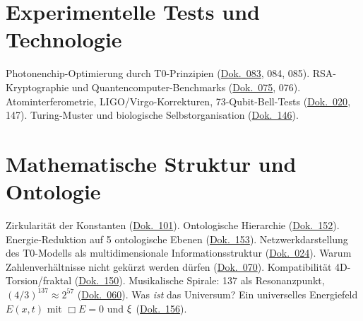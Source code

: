 \section{Experimentelle Tests und Technologie}
Photonenchip-Optimierung durch T0-Prinzipien (\href{https://github.com/jpascher/T0-Time-Mass-Duality/blob/main/2/pdf/083_T0_photonenchip-china_De.pdf}{Dok.~083}, 084, 085). RSA-Kryptographie und Quantencomputer-Benchmarks (\href{https://github.com/jpascher/T0-Time-Mass-Duality/blob/main/2/pdf/075_RSA_De.pdf}{Dok.~075}, 076). Atominterferometrie, LIGO/Virgo-Korrekturen, 73-Qubit-Bell-Tests (\href{https://github.com/jpascher/T0-Time-Mass-Duality/blob/main/2/pdf/020_T0_QM-QFT-RT_De.pdf}{Dok.~020}, 147). Turing-Muster und biologische Selbstorganisation (\href{https://github.com/jpascher/T0-Time-Mass-Duality/blob/main/2/pdf/146_turing_De.pdf}{Dok.~146}).

\section{Mathematische Struktur und Ontologie}
Zirkularität der Konstanten (\href{https://github.com/jpascher/T0-Time-Mass-Duality/blob/main/2/pdf/101_zirkularitaet-Konstanten_De.pdf}{Dok.~101}). Ontologische Hierarchie (\href{https://github.com/jpascher/T0-Time-Mass-Duality/blob/main/2/pdf/152_ontologische-ord_De.pdf}{Dok.~152}). Energie-Reduktion auf 5 ontologische Ebenen (\href{https://github.com/jpascher/T0-Time-Mass-Duality/blob/main/2/pdf/153_energie-reduktion-on_De.pdf}{Dok.~153}). Netzwerkdarstellung des T0-Modells als multidimensionale Informationsstruktur (\href{https://github.com/jpascher/T0-Time-Mass-Duality/blob/main/2/pdf/024_T0_netze_De.pdf}{Dok.~024}). Warum Zahlenverhältnisse nicht gekürzt werden dürfen (\href{https://github.com/jpascher/T0-Time-Mass-Duality/blob/main/2/pdf/070_Mathematische_struktur_De.pdf}{Dok.~070}). Kompatibilität 4D-Torsion/fraktal (\href{https://github.com/jpascher/T0-Time-Mass-Duality/blob/main/2/pdf/150_kompatiblitaet_De.pdf}{Dok.~150}). Musikalische Spirale: 137 als Resonanzpunkt, $(4/3)^{137} \approx 2^{57}$ (\href{https://github.com/jpascher/T0-Time-Mass-Duality/blob/main/2/pdf/060_musical-spiral-137-_De.pdf}{Dok.~060}). Was \emph{ist} das Universum? Ein universelles Energiefeld $E(x,t)$ mit $\Box E = 0$ und $\xi$ (\href{https://github.com/jpascher/T0-Time-Mass-Duality/blob/main/2/pdf/156_was-ist-universum_De.pdf}{Dok.~156}).
